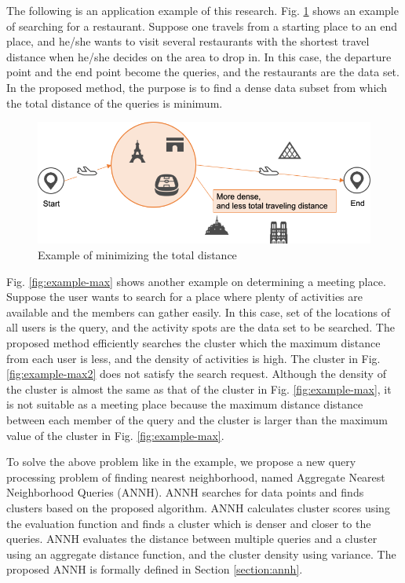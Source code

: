 \documentclass[a4paper,11pt]{report}
\theoremstyle{mytheoremstyle}
\begin{document}
The following is an application example of this research. Fig. \ref{fig:example-sum} shows an example of searching for a restaurant. Suppose one travels from a starting place to an end place, and he/she wants to visit several restaurants with the shortest travel distance when he/she decides on the area to drop in. In this case, the departure point and the end point become the queries, and the restaurants are the data set. In the proposed method, the purpose is to find a dense data subset from which the total distance of the queries is minimum.

\begin{figure}
\includegraphics[width=\textwidth]{images/example-sum.png}
\caption{Example of minimizing the total distance} \label{fig:example-sum}
\end{figure}

Fig. \ref{fig:example-max} shows another example on determining a meeting place. Suppose the user wants to search for a place where plenty of activities are available and the members can gather easily. In this case, set of the locations of all users is the query, and the activity spots are the data set to be searched. The proposed method efficiently searches the cluster which the maximum distance from each user is less, and the density of activities is high. The cluster in Fig. \ref{fig:example-max2} does not satisfy the search request.
Although the density of the cluster is almost the same as that of the cluster in Fig. \ref{fig:example-max}, it is not suitable as a meeting place because the maximum distance distance between each member of the query and the cluster is larger than the maximum value of the cluster in Fig. \ref{fig:example-max}.

To solve the above problem like in the example, we propose a new query processing problem of finding nearest neighborhood, named Aggregate Nearest Neighborhood Queries (ANNH).
ANNH searches for data points and finds clusters based on the proposed algorithm. ANNH calculates cluster scores using the evaluation function and finds a cluster which is denser and closer to the queries. ANNH evaluates the distance between multiple queries and a cluster using an aggregate distance function, and the cluster density using variance. The proposed ANNH is formally defined in Section \ref{section:annh}.
\end{document}
